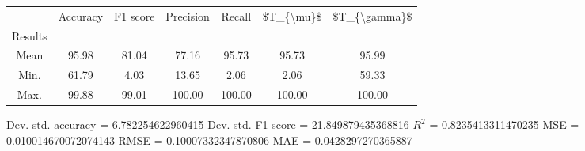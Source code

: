 \begin{tabular}{|c|c|c|c|c|c|c|}
\toprule
{} &  Accuracy &  F1 score &  Precision &  Recall &  \$T\_\{\textbackslash mu\}\$ &  \$T\_\{\textbackslash gamma\}\$ \\
Results &           &           &            &         &            &               \\
\hline
Mean    &     95.98 &     81.04 &      77.16 &   95.73 &      95.73 &         95.99 \\
Min.    &     61.79 &      4.03 &      13.65 &    2.06 &       2.06 &         59.33 \\
Max.    &     99.88 &     99.01 &     100.00 &  100.00 &     100.00 &        100.00 \\
\bottomrule
\end{tabular}

 Dev. std. accuracy = 6.782254622960415
 Dev. std. F1-score = 21.849879435368816
 $R^2$ = 0.8235413311470235
 MSE = 0.010014670072074143
 RMSE = 0.10007332347870806
 MAE = 0.0428297270365887